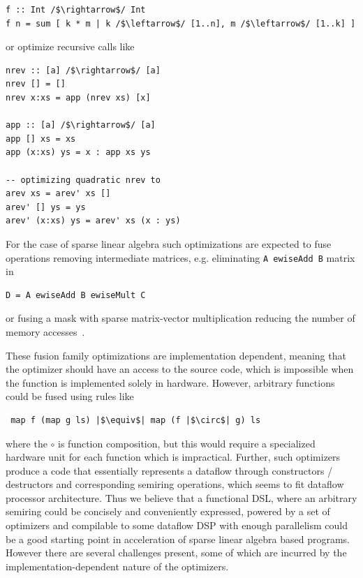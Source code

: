 \documentclass[sigplan,review,anonymous,nonacm]{acmart}\settopmatter{printfolios=true,printccs=false,printacmref=false}
\begin{document}
\begin{verbatim}
f :: Int /$\rightarrow$/ Int
f n = sum [ k * m | k /$\leftarrow$/ [1..n], m /$\leftarrow$/ [1..k] ] 
\end{verbatim}

or optimize recursive calls like

\begin{verbatim}
nrev :: [a] /$\rightarrow$/ [a]
nrev [] = []
nrev x:xs = app (nrev xs) [x]

app :: [a] /$\rightarrow$/ [a]
app [] xs = xs
app (x:xs) ys = x : app xs ys

-- optimizing quadratic nrev to
arev xs = arev' xs []
arev' [] ys = ys
arev' (x:xs) ys = arev' xs (x : ys)
\end{verbatim}

For the case of sparse linear algebra such optimizations are expected to fuse operations removing intermediate matrices, e.g. eliminating \texttt{A ewiseAdd B} matrix in

\begin{verbatim}
D = A ewiseAdd B ewiseMult C
\end{verbatim}
 
 or fusing a mask with sparse matrix-vector multiplication reducing the number of memory accesses~\cite{yang2020graphblast}.
 
 These fusion family optimizations are implementation dependent, meaning that the optimizer should have an access to the source code, which is impossible when the function is implemented solely in hardware. However, arbitrary functions could be fused using rules like 
\begin{verbatim}
 map f (map g ls) |$\equiv$| map (f |$\circ$| g) ls 
\end{verbatim}
where the $\circ$ is function composition, but this would require a specialized hardware unit for each function which is impractical. Further, such optimizers produce a code that essentially represents a dataflow through constructors / destructors and corresponding semiring operations, which seems to fit dataflow processor architecture. Thus we believe that a functional DSL, where an arbitrary semiring could be concisely and conveniently expressed, powered by a set of optimizers and compilable to some dataflow DSP with enough parallelism could be a good starting point in acceleration of sparse linear algebra based programs. However there are several challenges present, some of which are incurred by the implementation-dependent nature of the optimizers. 
\end{document}
